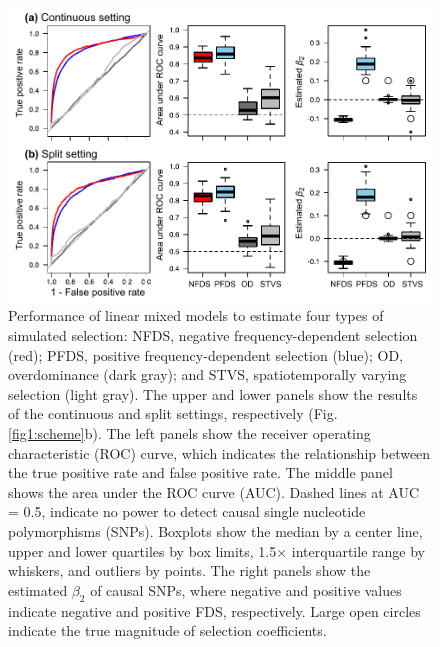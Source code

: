 \documentclass[12pt,]{article}
\begin{document}
\begin{figure}[]
  \includegraphics[width=\linewidth]{Fig3_beta2LMMdomi.pdf}
  \caption{Performance of linear mixed models to estimate four types of simulated selection: NFDS, negative frequency-dependent selection (red); PFDS, positive frequency-dependent selection (blue); OD, overdominance (dark gray); and STVS, spatiotemporally varying selection (light gray). The upper and lower panels show the results of the continuous and split settings, respectively (Fig. \ref{fig1:scheme}b). The left panels show the receiver operating characteristic (ROC) curve, which indicates the relationship between the true positive rate and false positive rate. The middle panel shows the area under the ROC curve (AUC). Dashed lines at AUC = 0.5, indicate no power to detect causal single nucleotide polymorphisms (SNPs). Boxplots show the median by a center line, upper and lower quartiles by box limits, 1.5$\times$ interquartile range by whiskers, and outliers by points. The right panels show the estimated $\beta_2$ of causal SNPs, where negative and positive values indicate negative and positive FDS, respectively. Large open circles indicate the true magnitude of selection coefficients.}
  \label{fig3:beta2LMM}
\end{figure}
\end{document}
